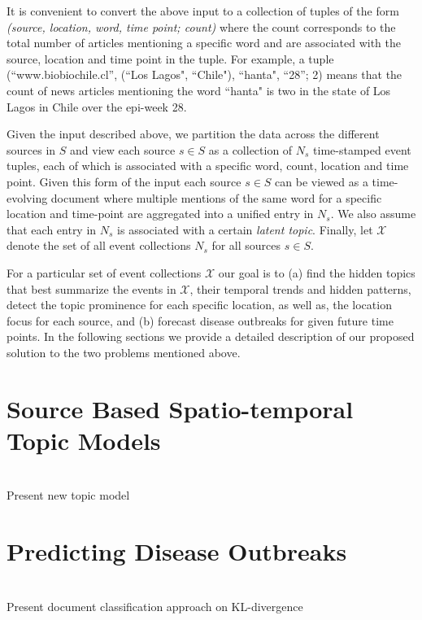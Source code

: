 \documentclass{sig-alternate}
\begin{document}
 It is convenient to convert the above input to a collection of tuples of the form {\em (source, location, word, time point; count)} where the count corresponds to the total number of articles mentioning a specific word and are associated with the source, location and time point in the tuple. For example, a tuple (``www.biobiochile.cl'', (``Los Lagos", ``Chile"), ``hanta", ``28''; 2) means that the count of news articles mentioning the word ``hanta" is two in the state of Los Lagos in Chile over the epi-week 28.  

Given the input described above, we partition the data across the different sources in $S$ and view each source $s \in S$ as a collection of $N_s$ time-stamped event tuples, each of which is associated with a specific word, count, location and time point. Given this form of the input each source $s \in S$ can be viewed as a time-evolving document where multiple mentions of the same word for a specific location and time-point are aggregated into a unified entry in $N_s$. We also assume that each entry in $N_s$ is associated with a certain {\em latent topic}. Finally, let $\mathcal{X}$ denote the set of all event collections $N_s$ for all sources $s \in S$.

For a particular set of event collections $\mathcal{X}$ our goal is to (a) find the hidden topics that best summarize the events in $\mathcal{X}$, their temporal trends and hidden patterns, detect the topic prominence for each specific location, as well as, the location focus for each source, and (b) forecast disease outbreaks for given future time points. In the following sections we provide a detailed description of our proposed solution to the two problems mentioned above. 

\section{Source Based Spatio-temporal \\ Topic Models}
\label{sec:model}

\ \\Present new topic model

\section{Predicting Disease Outbreaks}
\label{sec:pred}

\ \\Present document classification approach on KL-divergence
\end{document}
